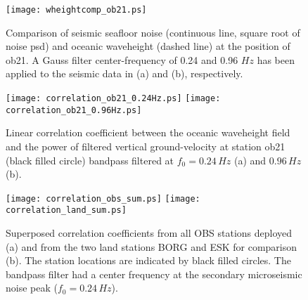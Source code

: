 \documentclass{article}
\renewcommand{\includegraphics}[2][1]{{\sf Figure: {\tt #1}}}
\begin{document}
{%
\begin{figure}
\centerline{
\texttt{[image: wheightcomp\_ob21.ps]}
}
\caption{
}
\label{wheightcomp}
Comparison of seismic seafloor noise (continuous line, square root of noise psd) and 
oceanic waveheight (dashed line) at the position of ob21.
A Gauss filter center-frequency of 0.24 and 0.96 $Hz$ has been 
applied to the seismic data in (a) and (b), respectively.
\end{figure}

\begin{figure}
\centerline{
\texttt{[image: correlation\_ob21\_0.24Hz.ps]}
\hskip-1cm
\texttt{[image: correlation\_ob21\_0.96Hz.ps]}
}
\caption{
Linear correlation coefficient between the 
oceanic waveheight field
and the 
power of 
filtered vertical ground-velocity at station ob21 
(black filled circle)
bandpass filtered
at $f_0 = 0.24\, Hz$ (a) 
and
$0.96\, Hz$ (b).
}
\label{wavecorr1}
\end{figure}

\begin{figure}
\centerline{
\texttt{[image: correlation\_obs\_sum.ps]}
\hskip-1cm
\texttt{[image: correlation\_land\_sum.ps]}
}
\caption{
Superposed 
correlation coefficients from all OBS stations deployed (a)
and from the two land stations BORG and ESK for comparison
(b).
The station locations are indicated by black filled circles.
The bandpass filter had a center frequency at the 
secondary microseismic noise peak 
($f_0 = 0.24\, Hz$).
}
\label{wavecorr2}
\end{figure}

}
\end{document}
